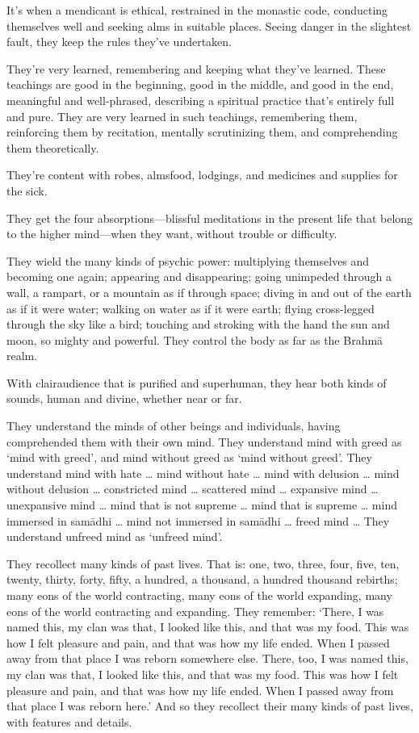 \documentclass[12pt,openany]{book}%
\begin{document}
It’s when a mendicant is ethical, restrained in the monastic code, conducting themselves well and seeking alms in suitable places. Seeing danger in the slightest fault, they keep the rules they’ve undertaken. 

They’re very learned, remembering and keeping what they’ve learned. These teachings are good in the beginning, good in the middle, and good in the end, meaningful and well-phrased, describing a spiritual practice that’s entirely full and pure. They are very learned in such teachings, remembering them, reinforcing them by recitation, mentally scrutinizing them, and comprehending them theoretically. 

They’re content with robes, almsfood, lodgings, and medicines and supplies for the sick. 

They get the four absorptions—blissful meditations in the present life that belong to the higher mind—when they want, without trouble or difficulty. 

They wield the many kinds of psychic power: multiplying themselves and becoming one again; appearing and disappearing; going unimpeded through a wall, a rampart, or a mountain as if through space; diving in and out of the earth as if it were water; walking on water as if it were earth; flying cross-legged through the sky like a bird; touching and stroking with the hand the sun and moon, so mighty and powerful. They control the body as far as the \textsanskrit{Brahmā} realm. 

With clairaudience that is purified and superhuman, they hear both kinds of sounds, human and divine, whether near or far. 

They understand the minds of other beings and individuals, having comprehended them with their own mind. They understand mind with greed as ‘mind with greed’, and mind without greed as ‘mind without greed’. They understand mind with hate … mind without hate … mind with delusion … mind without delusion … constricted mind … scattered mind … expansive mind … unexpansive mind … mind that is not supreme … mind that is supreme … mind immersed in \textsanskrit{samādhi} … mind not immersed in \textsanskrit{samādhi} … freed mind … They understand unfreed mind as ‘unfreed mind’. 

They recollect many kinds of past lives. That is: one, two, three, four, five, ten, twenty, thirty, forty, fifty, a hundred, a thousand, a hundred thousand rebirths; many eons of the world contracting, many eons of the world expanding, many eons of the world contracting and expanding. They remember: ‘There, I was named this, my clan was that, I looked like this, and that was my food. This was how I felt pleasure and pain, and that was how my life ended. When I passed away from that place I was reborn somewhere else. There, too, I was named this, my clan was that, I looked like this, and that was my food. This was how I felt pleasure and pain, and that was how my life ended. When I passed away from that place I was reborn here.’ And so they recollect their many kinds of past lives, with features and details. 
\end{document}
